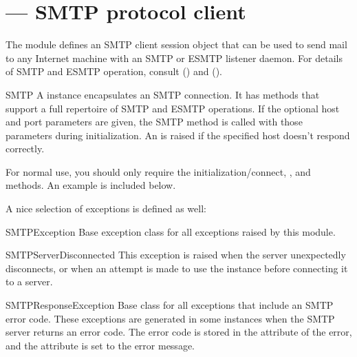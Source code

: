 \section{ ---
         SMTP protocol client}



The  module defines an SMTP client session object that
can be used to send mail to any Internet machine with an SMTP or ESMTP
listener daemon.  For details of SMTP and ESMTP operation, consult
 () and 
().

\begin{classdesc}{SMTP}{}
A  instance encapsulates an SMTP connection.  It has
methods that support a full repertoire of SMTP and ESMTP
operations. If the optional host and port parameters are given, the
SMTP  method is called with those parameters during
initialization.  An  is raised if the
specified host doesn't respond correctly.

For normal use, you should only require the initialization/connect,
, and  methods.  An example is
included below.
\end{classdesc}


A nice selection of exceptions is defined as well:

\begin{excdesc}{SMTPException}
  Base exception class for all exceptions raised by this module.
\end{excdesc}

\begin{excdesc}{SMTPServerDisconnected}
  This exception is raised when the server unexpectedly disconnects,
  or when an attempt is made to use the  instance before
  connecting it to a server.
\end{excdesc}

\begin{excdesc}{SMTPResponseException}
  Base class for all exceptions that include an SMTP error code.
  These exceptions are generated in some instances when the SMTP
  server returns an error code.  The error code is stored in the
   attribute of the error, and the
   attribute is set to the error message.
\end{excdesc}


